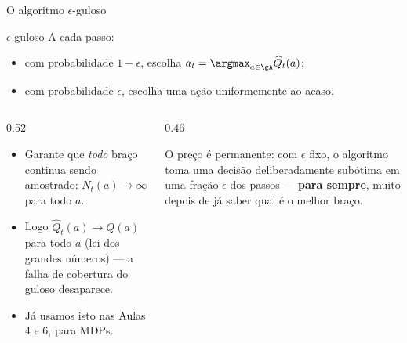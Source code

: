 \documentclass[aspectratio=169, 10pt]{beamer}
\newcommand{\Qhat}{\widehat{Q}}
\newcommand{\Nc}{N}                         %
\begin{document}
\begin{frame}{O algoritmo $\epsilon$-guloso}
  \begin{algbox}{$\epsilon$-guloso}
    A cada passo:
    \begin{itemize}\setlength{\itemsep}{0.2ex}
      \item com probabilidade $1 - \epsilon$, escolha
            $a_t = \argmax_{a \in \gA} \Qhat_t(a)$;
      \item com probabilidade $\epsilon$, escolha uma ação uniformemente
            ao acaso.
    \end{itemize}
  \end{algbox}

  \begin{columns}[T]
    \begin{column}{0.52\textwidth}
      \begin{itemize}
        \item Garante que \emph{todo} braço continua sendo amostrado:
              $\Nc_t(a) \to \infty$ para todo $a$.
        \item Logo $\Qhat_t(a) \to Q(a)$ para todo $a$ (lei dos grandes
              números) --- a falha de cobertura do guloso desaparece.
        \item Já usamos isto nas Aulas 4 e 6, para MDPs.
      \end{itemize}
    \end{column}
    \begin{column}{0.46\textwidth}
      \begin{alertabox}
        O preço é permanente: com $\epsilon$ fixo, o algoritmo toma uma
        decisão deliberadamente subótima em uma fração $\epsilon$ dos
        passos --- \textbf{para sempre}, muito depois de já saber qual é o
        melhor braço.
      \end{alertabox}
    \end{column}
  \end{columns}
\end{frame}
\end{document}
